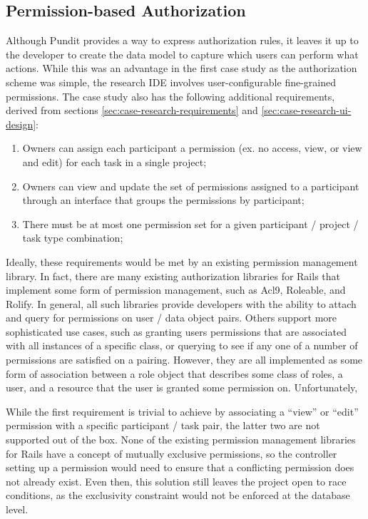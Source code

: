 \documentclass[document.tex]{subfiles}
\begin{document}
\FloatBarrier

\subsection {Permission-based Authorization}
\label{sec:case-research-permission-based-auth}

Although Pundit provides a way to express authorization rules, it leaves it up to the developer to create the data model to capture which users can perform what actions. While this was an advantage in the first case study as the authorization scheme was simple, the research IDE involves user-configurable fine-grained permissions. The case study also has the following additional requirements, derived from sections \ref{sec:case-research-requirements} and \ref{sec:case-research-ui-design}:
\begin{enumerate}
\item Owners can assign each participant a permission (ex. no access, view, or view and edit) for each task in a single project;
\item Owners can view and update the set of permissions assigned to a participant through an interface that groups the permissions by participant;
\item There must be at most one permission set for a given participant / project / task type combination;
\end{enumerate}

Ideally, these requirements would be met by an existing permission management library.
In fact, there are many existing authorization libraries for Rails that implement some form of permission management, such as Acl9, Roleable, and Rolify.
In general, all such libraries provide developers with the ability to attach and query for permissions on user / data object pairs.
Others support more sophisticated use cases, such as granting users permissions that are associated with all instances of a specific class, or querying to see if any one of a number of permissions are satisfied on a pairing.
However, they are all implemented as some form of association between a role object that describes some class of roles, a user, and a resource that the user is granted some permission on. Unfortunately, 

While the first requirement is trivial to achieve by associating a ``view'' or ``edit'' permission with a specific participant / task pair, the latter two are not supported out of the box.
None of the existing permission management libraries for Rails have a concept of
mutually exclusive permissions, so the controller setting up a permission would need to ensure that a conflicting permission does not already exist.
Even then, this solution still leaves the project open to race conditions, as the exclusivity constraint would not be enforced at the database level.
\end{document}
